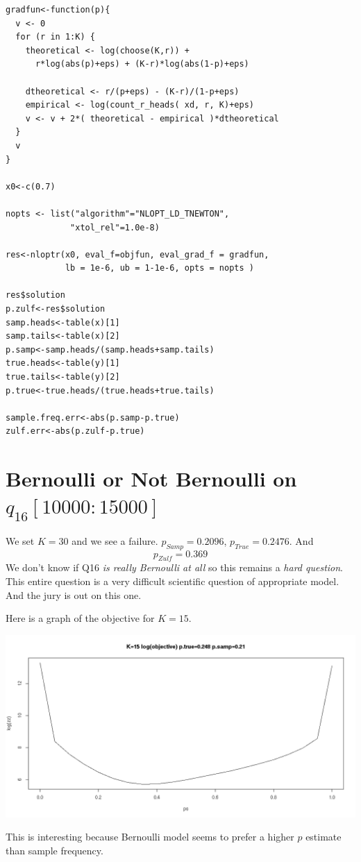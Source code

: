 \documentclass{amsart}
\begin{document}
\begin{verbatim}
gradfun<-function(p){
  v <- 0
  for (r in 1:K) {
    theoretical <- log(choose(K,r)) + 
      r*log(abs(p)+eps) + (K-r)*log(abs(1-p)+eps)
      
    dtheoretical <- r/(p+eps) - (K-r)/(1-p+eps)
    empirical <- log(count_r_heads( xd, r, K)+eps)
    v <- v + 2*( theoretical - empirical )*dtheoretical
  }
  v
}

x0<-c(0.7)

nopts <- list("algorithm"="NLOPT_LD_TNEWTON",
             "xtol_rel"=1.0e-8)

res<-nloptr(x0, eval_f=objfun, eval_grad_f = gradfun, 
            lb = 1e-6, ub = 1-1e-6, opts = nopts )

res$solution
p.zulf<-res$solution
samp.heads<-table(x)[1]
samp.tails<-table(x)[2]
p.samp<-samp.heads/(samp.heads+samp.tails)
true.heads<-table(y)[1]
true.tails<-table(y)[2]
p.true<-true.heads/(true.heads+true.tails)

sample.freq.err<-abs(p.samp-p.true)
zulf.err<-abs(p.zulf-p.true)
\end{verbatim}


\section{Bernoulli or Not Bernoulli on $q_{16}[10000:15000]$}

We set $K=30$ and we see a failure.  $p_{Samp}=0.2096$, $p_{True}=0.2476$.  And
\[
p_{Zulf} = 0.369
\]
We don't know if Q16 {\em is really Bernoulli at all} so this remains a {\em hard question}.  This entire question is a very difficult scientific question of appropriate model.  And the jury is out on this one.

Here is a graph of the objective for $K=15$.

\includegraphics[scale=0.4]{log_obj_k15_q16.png}

This is interesting because Bernoulli model seems to prefer a higher $p$ estimate than sample frequency.
\end{document}
